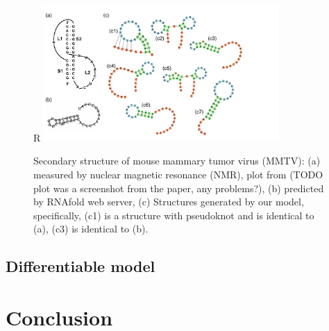 \documentclass{article}
\begin{document}
\begin{figure}{R}
    \centering
    \includegraphics[width=0.8\textwidth]{plot/sample_structure_pseudoknot.pdf}
    \caption{Secondary structure of mouse mammary tumor virus (MMTV): (a) measured by nuclear magnetic resonance (NMR), plot from \cite{staple2005pseudoknots} (TODO plot was a screenshot from the paper, any problems?), (b) predicted by RNAfold web server, (c) Structures generated by our model, specifically, (c1) is a structure with pseudoknot and is identical to (a), (c3) is identical to (b).}
    \label{fig:sample_structure_pseudoknot}
    \centering
\end{figure}



%
%

\subsection{Differentiable model}




\section{Conclusion}

%
%
%



\clearpage




%
%
%
\end{document}
